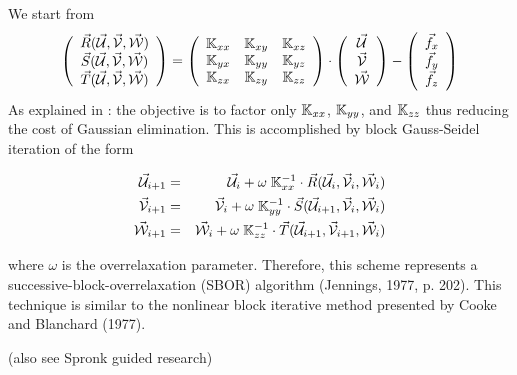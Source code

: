 \documentclass[a4paper,12pt]{article}
\begin{document}
We start from 
\[
\left(
\begin{array}{c}
\vec{R}(\vec{\cal U},\vec{\cal V},\vec{\cal W}) \\ 
\vec{S}(\vec{\cal U},\vec{\cal V},\vec{\cal W}) \\ 
\vec{T}(\vec{\cal U},\vec{\cal V},\vec{\cal W}) \\ 
\end{array}
\right)
=
\left(
\begin{array}{ccc}
{\mathbb{K}}_{xx} & {\mathbb{K}}_{xy} & {\mathbb{K}}_{xz} \\
{\mathbb{K}}_{yx} & {\mathbb{K}}_{yy} & {\mathbb{K}}_{yz} \\
{\mathbb{K}}_{zx} & {\mathbb{K}}_{zy} & {\mathbb{K}}_{zz} \\
\end{array}
\right)
\cdot
\left(
\begin{array}{c}
\vec{\cal U}\\
\vec{\cal V}\\
\vec{\cal W}
\end{array}
\right)
-
\left(
\begin{array}{c}
\vec{f}_x\\
\vec{f}_y\\
\vec{f}_z
\end{array}
\right)
\]
As explained in \textcite{lefr87}:
the objective is to factor only ${\mathbb{K}}_{xx}$, ${\mathbb{K}}_{yy}$, and ${\mathbb{K}}_{zz}$
thus reducing the cost of Gaussian elimination. This is accomplished
by block Gauss-Seidel iteration of the form

\begin{eqnarray}
\vec{\cal U}_{i+1} 
&=& \vec{\cal U}_i + \omega \; {\mathbb{K}}_{xx}^{-1} \cdot \vec{R}(\vec{\cal U}_i,\vec{\cal V}_i,\vec{\cal W}_i) \\
\vec{\cal V}_{i+1} 
&=& \vec{\cal V}_{i} + \omega \; {\mathbb{K}}_{yy}^{-1} \cdot \vec{S}(\vec{\cal U}_{i+1},\vec{\cal V}_i,\vec{\cal W}_i) \\
\vec{\cal W}_{i+1} 
&=& \vec{\cal W}_{i} + \omega \; {\mathbb{K}}_{zz}^{-1} \cdot \vec{T}(\vec{\cal U}_{i+1},\vec{\cal V}_{i+1},\vec{\cal W}_i) 
\end{eqnarray}

where $\omega$ is the overrelaxation parameter. Therefore, this scheme represents a successive-block-overrelaxation
(SBOR) algorithm (Jennings, 1977, p. 202). This technique is similar to the nonlinear block iterative method presented
by Cooke and Blanchard (1977).

(also see Spronk guided research)
\end{document}

